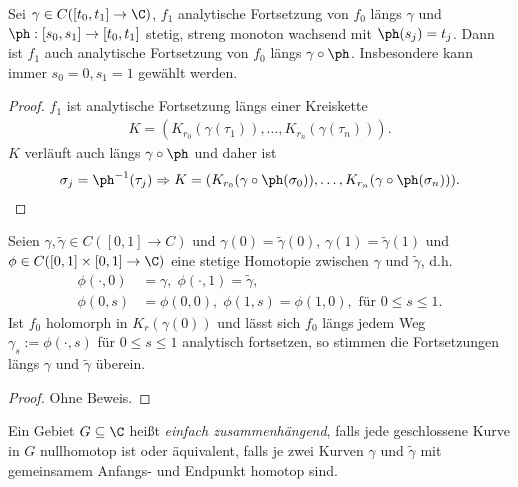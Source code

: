 \begin{lem}
\label{prop:2.72}
Sei $\gamma\in C([t_0,t_1]\to\C)$, $f_1$ analytische Fortsetzung von $f_0$
längs $\gamma$ und $\ph: [s_0,s_1]\to[t_0,t_1]$ stetig, streng monoton wachsend
mit $\ph(s_j)=t_j$. Dann ist $f_1$ auch analytische Fortsetzung von $f_0$ längs
$\gamma\circ\ph$. Insbesondere kann immer $s_0 = 0, s_1=1$ gewählt werden.
\end{lem}
\begin{proof}
$f_1$ ist analytische Fortsetzung längs einer Kreiskette
\begin{align*}
K=(K_{r_0}(\gamma(\tau_1)),\ldots,K_{r_n}(\gamma(\tau_n))).
\end{align*}
$K$ verläuft auch längs $\gamma\circ\ph$ und daher ist
\begin{align*}
\sigma_j = \ph^{-1}(\tau_j) \Rightarrow K =
(K_{r_0}(\gamma\circ\ph(\sigma_0)),\ldots,K_{r_n}(\gamma\circ\ph(\sigma_n))).\qedhere
\end{align*}
\end{proof}
\begin{prop}[Monodromiesatz]
Seien $\gamma,\tilde{\gamma}\in C([0,1]\to C)$ und $\gamma(0) =
\tilde{\gamma}(0)$, $\gamma(1)=\tilde{\gamma}(1)$ und $\phi\in
C([0,1]\times[0,1]\to\C)$ eine stetige Homotopie zwischen $\gamma $ und
$\tilde{\gamma}$, d.h.
\begin{align*}
\phi(\cdot,0) &= \gamma,\;\phi(\cdot,1) = \tilde{\gamma},\\
\phi(0,s) &= \phi(0,0),\;\phi(1,s) = \phi(1,0), \text{ für } 0\le s\le 1.
\end{align*}
Ist $f_0$ holomorph in $K_r(\gamma(0))$ und lässt sich $f_0$ längs jedem Weg
$\gamma_s:=\phi(\cdot,s)$ für $0\le s\le 1$ analytisch fortsetzen, so stimmen
die Fortsetzungen längs $\gamma$ und $\tilde{\gamma}$ überein.\fishhere
\end{prop}
\begin{proof}
Ohne Beweis.\qedhere
\end{proof}


\begin{defn}
\label{defn:2.74}
Ein Gebiet  $G\subseteq \C$ heißt \emph{einfach zusammenhängend}, falls jede
geschlossene Kurve in $G$ nullhomotop ist oder äquivalent, falls je zwei Kurven
$\gamma$ und $\tilde{\gamma}$ mit gemeinsamem Anfangs- und Endpunkt homotop
sind.\fishhere
\end{defn}

